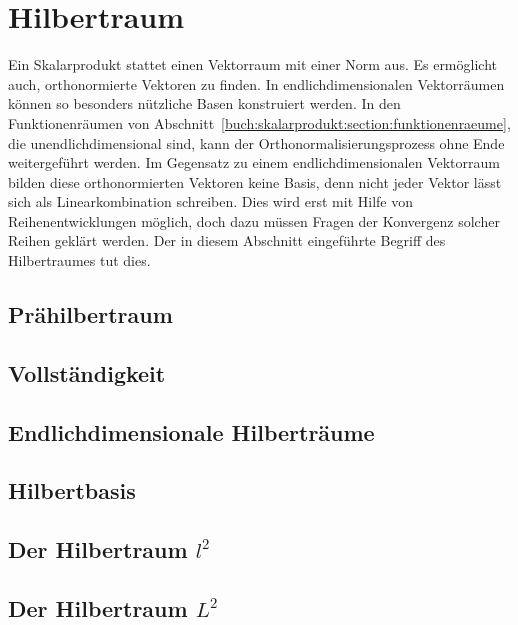 %
%
%
\section{Hilbertraum
\label{buch:skalarprodukt:section:hilbertraum}}
Ein Skalarprodukt stattet einen Vektorraum mit einer Norm aus.
Es ermöglicht auch, orthonormierte Vektoren zu finden.
In endlichdimensionalen Vektorräumen können so besonders nützliche
Basen konstruiert werden.
In den Funktionenräumen von
Abschnitt~\ref{buch:skalarprodukt:section:funktionenraeume},
die unendlichdimensional sind, kann der Orthonormalisierungsprozess
ohne Ende weitergeführt werden.
Im Gegensatz zu einem endlichdimensionalen Vektorraum bilden diese
orthonormierten Vektoren keine Basis, denn nicht jeder Vektor lässt
sich als Linearkombination schreiben.
Dies wird erst mit Hilfe von Reihenentwicklungen möglich, doch dazu
müssen Fragen der Konvergenz solcher Reihen geklärt werden.
Der in diesem Abschnitt eingeführte Begriff des Hilbertraumes tut dies.


\subsection{Prähilbertraum}

\subsection{Vollständigkeit}

\subsection{Endlichdimensionale Hilberträume}

\subsection{Hilbertbasis}

\subsection{Der Hilbertraum $l^2$}

\subsection{Der Hilbertraum $L^2$}

